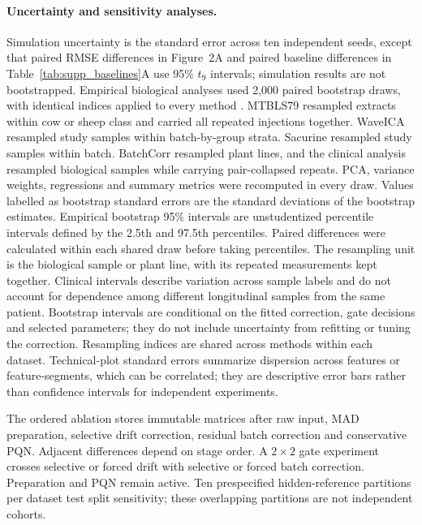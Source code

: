 \documentclass[namedate,webpdf,modern,large,nocrop]{oup-authoring-template}
\begin{document}
\paragraph{Uncertainty and sensitivity analyses.} Simulation uncertainty is the standard error across ten independent seeds, except that paired RMSE differences in Figure~2A and paired baseline differences in Table~\ref{tab:supp_baselines}A use 95\% $t_9$ intervals; simulation results are not bootstrapped. Empirical biological analyses used 2,000 paired bootstrap draws, with identical indices applied to every method \citep{EfronTibshirani1993}. MTBLS79 resampled extracts within cow or sheep class and carried all repeated injections together. WaveICA resampled study samples within batch-by-group strata. Sacurine resampled study samples within batch. BatchCorr resampled plant lines, and the clinical analysis resampled biological samples while carrying pair-collapsed repeats. PCA, variance weights, regressions and summary metrics were recomputed in every draw. Values labelled as bootstrap standard errors are the standard deviations of the bootstrap estimates. Empirical bootstrap 95\% intervals are unstudentized percentile intervals defined by the 2.5th and 97.5th percentiles. Paired differences were calculated within each shared draw before taking percentiles. The resampling unit is the biological sample or plant line, with its repeated measurements kept together. Clinical intervals describe variation across sample labels and do not account for dependence among different longitudinal samples from the same patient. Bootstrap intervals are conditional on the fitted correction, gate decisions and selected parameters; they do not include uncertainty from refitting or tuning the correction. Resampling indices are shared across methods within each dataset. Technical-plot standard errors summarize dispersion across features or feature-segments, which can be correlated; they are descriptive error bars rather than confidence intervals for independent experiments.

The ordered ablation stores immutable matrices after raw input, MAD preparation, selective drift correction, residual batch correction and conservative PQN. Adjacent differences depend on stage order. A \(2\times2\) gate experiment crosses selective or forced drift with selective or forced batch correction. Preparation and PQN remain active. Ten prespecified hidden-reference partitions per dataset test split sensitivity; these overlapping partitions are not independent cohorts.
\end{document}
